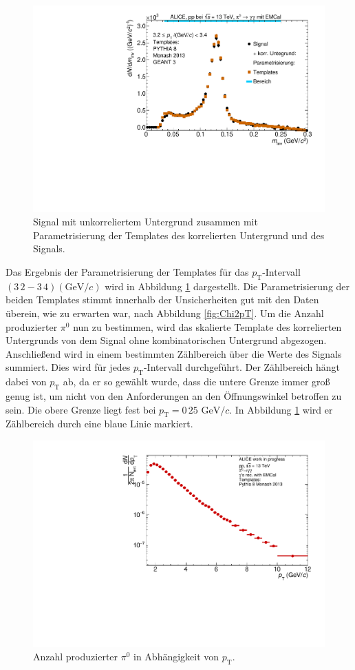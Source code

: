\begin{figure}[t!]
\centering
\includegraphics[width=.65\linewidth]{ParamResult_Bin10_Data_2016.pdf}
\caption{Signal mit unkorreliertem Untergrund zusammen mit Parametrisierung der Templates des korrelierten Untergrund und des Signals.
}
\label{fig:ParamResult}
\end{figure}
Das Ergebnis der Parametrisierung der Templates für das $p_\text{T}$-Intervall $(3\,2-3\,4)(\text{GeV/}c)$ wird in Abbildung \ref{fig:ParamResult} dargestellt.
Die Parametrisierung der beiden Templates stimmt innerhalb der Unsicherheiten gut mit den Daten überein, wie zu erwarten war, nach Abbildung \ref{fig:Chi2pT}.
\newline
Um die Anzahl produzierter $\pi^{0}$ nun zu bestimmen, wird das skalierte Template des korrelierten Untergrunds von dem Signal ohne kombinatorischen Untergrund abgezogen.
Anschließend wird in einem bestimmten Zählbereich über die Werte des Signals summiert.
Dies wird für jedes $p_\text{T}$-Intervall durchgeführt.
\newline
Der Zählbereich hängt dabei von $p_\text{T}$ ab, da er so gewählt wurde, dass die untere Grenze immer groß genug ist, um nicht von den Anforderungen an den Öffnungswinkel betroffen zu sein.
Die obere Grenze liegt fest bei $p_\text{T} = 0\,25 \text{ GeV}/c$.
In Abbildung \ref{fig:ParamResult} wird er Zählbereich durch eine blaue Linie markiert.
\begin{figure}[t!]
\centering
\includegraphics[width=.65\linewidth]{UncorrYields_Data_2016.pdf}
\caption{Anzahl produzierter $\pi^{0}$ in Abhängigkeit von $p_\text{T}$.
}
\label{fig:RawYield}
\end{figure}

